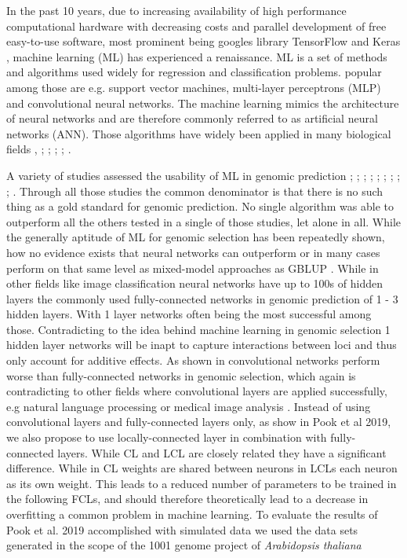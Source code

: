 In the past 10 years, due to increasing availability of high performance computational hardware with
decreasing costs and parallel development of free easy-to-use software, most prominent being googles library
TensorFlow \cite{TF2016} and Keras \cite{keras2015}, machine learning (ML) has experienced a renaissance. ML
is a set of methods and algorithms used widely for regression and classification problems. popular among those
are e.g. support vector machines, multi-layer perceptrons (MLP) and convolutional neural networks. The machine
learning mimics the architecture of neural networks and are therefore commonly referred to as artificial
neural networks (ANN). Those algorithms have widely been applied in many biological fields \cite{min2017deep}
, \cite{lan2018survey}; \cite{mamoshina2016applications}; \cite{angermueller2016} ; \cite{webb2018deep};
\cite{rampasek2016tensorflow}.

A variety of studies assessed the usability of ML in genomic prediction \cite{gonzalez2018applications};
\cite{gonza2016}; \cite{ogutu2011comparison}; \cite{montesinos2019benchmarking}; \cite{grinberg2018evaluation}
; \cite{cuevas2019deep}; \cite{montesinos2019new}; \cite{ma2017deepgs}; \cite{qiu2016application};
\cite{gonza2012} \cite{li2018genomic}. Through all those studies the common denominator is that there is no
such thing as a gold standard for genomic prediction. No single algorithm was able to outperform all the
others tested in a single of those studies, let alone in all. While the generally aptitude of ML for genomic
selection has been repeatedly shown, how no evidence exists that neural networks can outperform or in many
cases perform on that same level as mixed-model approaches as GBLUP \cite{hayes2001}. While in other fields
like image classification neural networks have up to 100s of hidden layers \cite{he2016deep} the commonly used
fully-connected networks in genomic prediction of 1 - 3 hidden layers. With 1 layer networks often being the
most successful among those. Contradicting to the idea behind machine learning in genomic selection 1 hidden
layer networks will be inapt to capture interactions between loci and thus only account for additive
effects. As shown in \cite{azodi2019} convolutional networks perform worse than fully-connected networks in
genomic selection, which again is contradicting to other fields where convolutional layers are applied
successfully, e.g natural language processing \cite{dos2014deep} or medical image analysis
\cite{litjens2017survey}. Instead of using convolutional layers and fully-connected layers only, as show in
Pook et al 2019, we also propose to use locally-connected layer in combination with fully-connected
layers. While CL and LCL are closely related they have a significant difference. While in CL weights are
shared between neurons in LCLs each neuron as its own weight. This leads to a reduced number of parameters to
be trained in the following FCLs, and should therefore theoretically lead to a decrease in overfitting a
common problem in machine learning. To evaluate the results of Pook et al. 2019 accomplished with simulated
data we used the data sets generated in the scope of the 1001 genome project of \textit{Arabidopsis thaliana}
\cite{1001genome}


